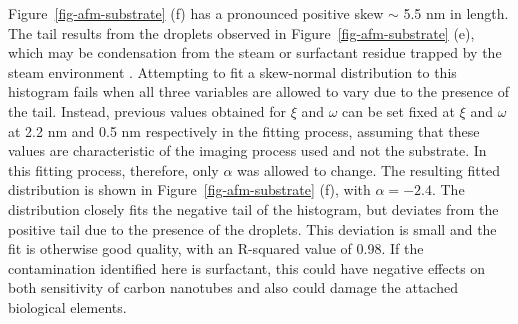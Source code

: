 \documentclass[
  a4paper,
]{scrbook}
\begin{document}
Figure~\ref{fig-afm-substrate} (f) has a pronounced positive skew
\(\sim\) 5.5 nm in length. The tail results from the droplets observed
in Figure~\ref{fig-afm-substrate} (e), which may be condensation from
the steam or surfactant residue trapped by the steam environment
\autocite{Christensen2022,Vobornik2023}. Attempting to fit a skew-normal
distribution to this histogram fails when all three variables are
allowed to vary due to the presence of the tail. Instead, previous
values obtained for \(\xi\) and \(\omega\) can be set fixed at \(\xi\)
and \(\omega\) at 2.2 nm and 0.5 nm respectively in the fitting process,
assuming that these values are characteristic of the imaging process
used and not the substrate. In this fitting process, therefore, only
\(\alpha\) was allowed to change. The resulting fitted distribution is
shown in Figure~\ref{fig-afm-substrate} (f), with \(\alpha = -2.4\). The
distribution closely fits the negative tail of the histogram, but
deviates from the positive tail due to the presence of the droplets.
This deviation is small and the fit is otherwise good quality, with an
R-squared value of 0.98. If the contamination identified here is
surfactant, this could have negative effects on both sensitivity of
carbon nanotubes and also could damage the attached biological elements.
\end{document}
